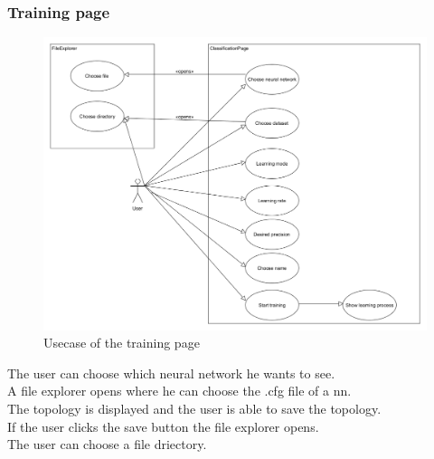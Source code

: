 \documentclass[parskip=full]{scrartcl}
\begin{document}
\subsubsection{Training page}
\begin{figure}[htb!]
\centering
\includegraphics[width=\textwidth]{TrainUsecase}
\caption{Usecase of the training page}
\end{figure}
The user can choose which neural network he wants to see.\\
A file explorer opens where he can choose the .cfg file of a \gls{nn}.\\
The topology is displayed and the user is able to save the topology.\\
If the user clicks the save button the file explorer opens.\\
The user can choose a file driectory.
\clearpage
\end{document}

